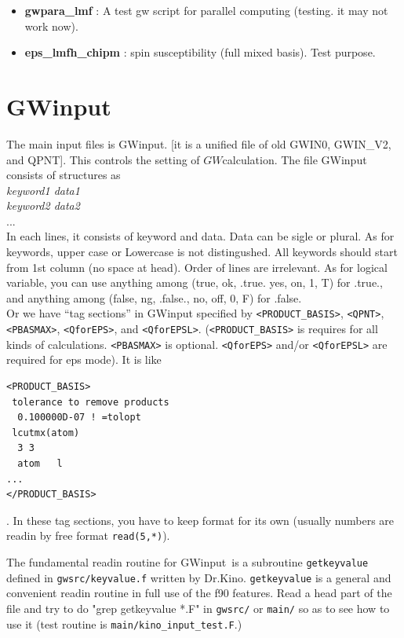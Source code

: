 \documentclass[a4paper,10pt,epsf,fleqn]{article}
\newcommand{\GW}{$GW$}
\newcommand{\GWinput}{{\sf GWinput}\ }
\begin{document}
{\begin{itemize}
\item
{\bf gwpara\_lmf} : A test gw script for parallel computing (testing. it may not work now).

\item
{\bf eps\_lmfh\_chipm} : spin susceptibility (full mixed basis). Test purpose.
\end{itemize}


\newpage
\section{GWinput}
\label{maininput}

The main input files is {\sf GWinput}.
[it is a unified file of old {\sf GWIN0},  {\sf GWIN\_V2}, and {\sf QPNT}].
This controls the setting of \GW calculation.
The file {\sf GWinput} consists of
structures as\\
{\it keyword1 data1}\\
{\it keyword2 data2}\\
...\\
In each lines, it consists of keyword and data. 
Data can be sigle or plural.
As for keywords, upper case or Lowercase is not distingushed.
All keywords should start from 1st column (no space at head).
Order of lines are irrelevant.
As for logical variable, you can use 
anything among (true, ok, .true. yes, on, 1, T) for .true.,
and anything among (false, ng, .false., no, off, 0, F) for .false.\\

Or we have ``tag sections'' in {\sf GWinput} 
specified by \verb#<PRODUCT_BASIS>#, 
\verb#<QPNT>#,  \verb#<PBASMAX>#, \verb#<QforEPS>#, and \verb#<QforEPSL>#.
(\verb#<PRODUCT_BASIS># is requires for all kinds of calculations.
\verb#<PBASMAX># is optional. \verb#<QforEPS># and/or \verb#<QforEPSL># are required
for eps mode). It is like
\begin{verbatim}
<PRODUCT_BASIS>
 tolerance to remove products
  0.100000D-07 ! =tolopt
 lcutmx(atom) 
  3 3 
  atom   l
...
</PRODUCT_BASIS>
\end{verbatim}
. In these tag sections, you have to keep format for its own
(usually numbers are readin by free format \verb#read(5,*)#).

The fundamental readin routine for \GWinput is a subroutine 
\verb#getkeyvalue# defined in \verb#gwsrc/keyvalue.f# written by Dr.Kino.
\verb#getkeyvalue# is a general and convenient readin routine in full use of the f90 features.
Read a head part of the file and try to do "grep getkeyvalue *.F" 
in \verb#gwsrc/# or \verb#main/# so as to see how to use it
(test routine is \verb#main/kino_input_test.F#.)

}
\end{document}
